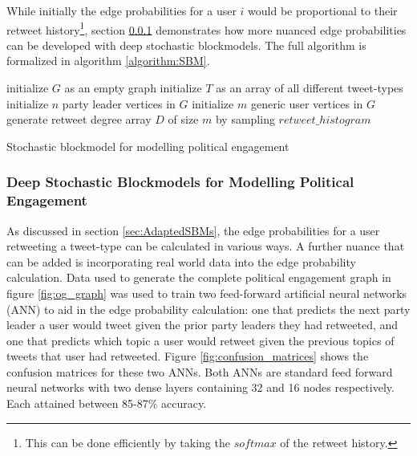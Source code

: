 While initially the edge probabilities for a user $i$ would be proportional to
their retweet history\footnote{This can be done efficiently by taking the
$softmax$ of the retweet history.}, section \ref{sec:DeepSBMs} demonstrates
how more nuanced edge probabilities can be developed with deep stochastic
blockmodels. The full algorithm is formalized in algorithm \ref{algorithm:SBM}.

\begin{singlespacing}
\begin{algorithm}[H]
    \SetAlgoLined
    initialize $G$ as an empty graph\;
    initialize $T$ as an array of all different tweet-types\;
    initialize $n$ party leader vertices in $G$\;
    initialize $m$ generic user vertices in $G$\;
    generate retweet degree array $D$ of size $m$ by sampling $retweet\_histogram$\;
     \caption{Stochastic blockmodel for modelling political engagement}
     \label{algorithm:SBM}
\end{algorithm}
\end{singlespacing}


\subsubsection{Deep Stochastic Blockmodels for Modelling Political Engagement}\label{sec:DeepSBMs}

As discussed in section \ref{sec:AdaptedSBMs}, the edge probabilities for a user
retweeting a tweet-type can be calculated in various ways. A further nuance that
can be added is incorporating real world data into the edge probability
calculation. Data used to generate the complete political engagement graph in
figure \ref{fig:og_graph} was used to train two feed-forward artificial neural
networks (ANN) to aid in the edge probability calculation: one that predicts the
next party leader a user would tweet given the prior party leaders they had
retweeted, and one that predicts which topic a user would retweet given the
previous topics of tweets that user had retweeted. Figure
\ref{fig:confusion_matrices} shows the confusion matrices for these two ANNs.
Both ANNs are standard feed forward neural networks with two dense layers
containing 32 and 16 nodes respectively. Each attained between 85-87\% accuracy.

